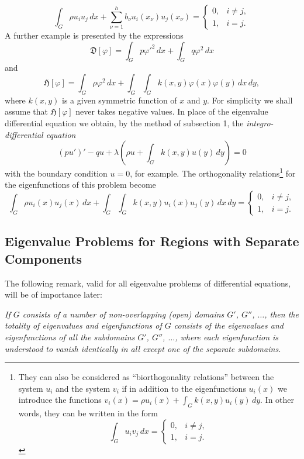\begin{equation}\tag{14}
\int_G\rho u_i u_j\,dx+\sum_{\nu=1}^hb_\nu u_i(x_\nu)u_j(x_\nu)
=\begin{cases}0,&i\ne j,\\1,&i=j.\end{cases}
\end{equation}
A further example is presented by the expressions
\begin{equation}\tag{15}
\mathfrak D[\varphi]=\int_Gp\varphi'^2\,dx+\int_Gq\varphi^2\,dx
\end{equation}
and
\begin{equation}\tag{15a}
\mathfrak H[\varphi]=\int_G\rho\varphi^2\,dx+\int_G\int_G k(x,y)\varphi(x)\varphi(y)\,dx\,dy,
\end{equation}
where $k(x,y)$ is a given symmetric function of $x$ and $y$. For simplicity we shall assume that $\mathfrak H[\varphi]$ never takes negative values. In place of the eigenvalue differential equation we obtain, by the method of subsection 1, the \emph{integro-differential equation}
\begin{equation}\tag{16}
(pu')'-qu+\lambda\left(\rho u+\int_Gk(x,y)u(y)\,dy\right)=0
\end{equation}
with the boundary condition $u=0$, for example. The orthogonality relations\footnote{They can also be considered as ``biorthogonality relations'' between the system $u_i$ and the system $v_i$ if in addition to the eigenfunctions $u_i(x)$ we introduce the functions $v_i(x)=\rho u_i(x)+\int_Gk(x,y)u_i(y)\,dy$. In other words, they can be written in the form
\[
\int_Gu_i v_j\,dx=\begin{cases}0,&i\ne j,\\1,&i=j.\end{cases}
\]} for the eigenfunctions of this problem become
\[
\int_G\rho u_i(x)u_j(x)\,dx+\int_G\int_Gk(x,y)u_i(x)u_j(y)\,dx\,dy
=\begin{cases}0,&i\ne j,\\1,&i=j.\end{cases}
\]

\subsection{Eigenvalue Problems for Regions with Separate Components}
The following remark, valid for all eigenvalue problems of differential equations, will be of importance later:

\emph{If $G$ consists of a number of non-overlapping (open) domains $G'$, $G''$, $\ldots$, then the totality of eigenvalues and eigenfunctions of $G$ consists of the eigenvalues and eigenfunctions of all the subdomains $G'$, $G''$, $\ldots$, where each eigenfunction is understood to vanish identically in all except one of the separate subdomains.}

